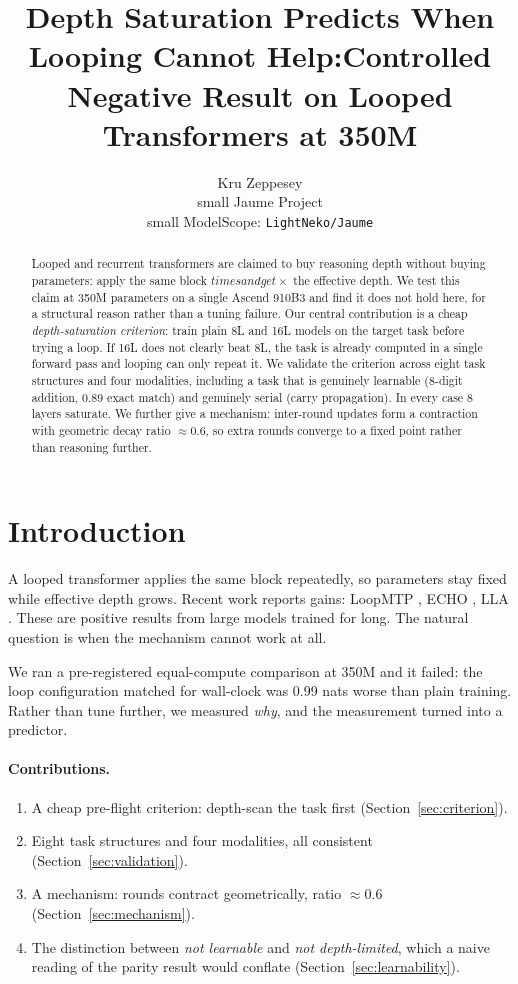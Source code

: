 \documentclass[10pt,twocolumn,letterpaper]{article}
\title{\vspace{-1.2em}Depth Saturation Predicts When Looping Cannot Help:\A Controlled Negative Result on Looped Transformers at 350M}
\author{Kru Zeppesey\\small Jaume Project\\small ModelScope: \texttt{LightNeko/Jaume}}
\date{}
\begin{document}
\maketitle

\begin{abstract}
Looped and recurrent transformers are claimed to buy reasoning depth without
buying parameters: apply the same block $ times and get \times$ the
effective depth. We test this claim at 350M parameters on a single Ascend
910B3 and find it does not hold here, for a structural reason rather than a
tuning failure. Our central contribution is a cheap \emph{depth-saturation
criterion}: train plain 8L and 16L models on the target task before trying a
loop. If 16L does not clearly beat 8L, the task is already computed in a
single forward pass and looping can only repeat it. We validate the criterion
across eight task structures and four modalities, including a task that is
genuinely learnable (8-digit addition, 0.89 exact match) and genuinely
serial (carry propagation). In every case 8 layers saturate. We further give
a mechanism: inter-round updates form a contraction with geometric decay
ratio $\approx 0.6$, so extra rounds converge to a fixed point rather than
reasoning further.
\end{abstract}

\section{Introduction}

A looped transformer applies the same block repeatedly, so parameters stay
fixed while effective depth grows. Recent work reports gains: LoopMTP
\cite{loopmtp}, ECHO \cite{echo}, LLA \cite{lla}. These are positive results
from large models trained for long. The natural question is when the
mechanism cannot work at all.

We ran a pre-registered equal-compute comparison at 350M and it failed:
the loop configuration matched for wall-clock was 0.99 nats worse than plain
training. Rather than tune further, we measured \emph{why}, and the
measurement turned into a predictor.

\paragraph{Contributions.}
\begin{enumerate}[leftmargin=1.2em,itemsep=1pt,topsep=2pt]
\item A cheap pre-flight criterion: depth-scan the task first
      (Section~\ref{sec:criterion}).
\item Eight task structures and four modalities, all consistent
      (Section~\ref{sec:validation}).
\item A mechanism: rounds contract geometrically, ratio $\approx 0.6$
      (Section~\ref{sec:mechanism}).
\item The distinction between \emph{not learnable} and \emph{not depth-limited},
      which a naive reading of the parity result would conflate
      (Section~\ref{sec:learnability}).
\end{enumerate}
\end{document}
